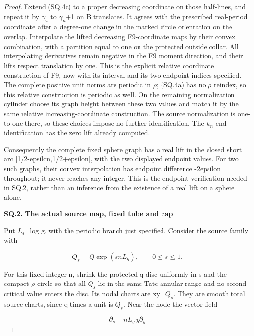\begin{proof}
Extend (SQ.4c) to a proper decreasing coordinate on those half-lines,
and repeat it by \(\gamma_{n}\) to \(\gamma_{n}\)+1 on B translates. It agrees
with the prescribed real-period coordinate after a degree-one change in the marked circle orientation
on the overlap. Interpolate the lifted decreasing F9-coordinate
maps by their convex combination, with a partition equal to one
on the protected outside collar. All interpolating derivatives
remain negative in the F9 moment direction, and their lifts respect translation by one.
This is the explicit relative coordinate construction of F9, now
with its interval and its two endpoint indices specified. The
complete positive unit norms are periodic in \(\rho\); (SQ.4a) has no
\(\rho\) reindex, so this relative construction is periodic as well.
On the remaining normalization cylinder choose its graph height
between these two values and match it by the same relative
increasing-coordinate construction. The source normalization is
one-to-one there, so these choices impose no further identification.
The \(h_{n}\) end identification has the zero lift already computed.

Consequently the complete fixed sphere graph has a real lift in the closed short arc
{[}1/2-epsilon,1/2+epsilon{]}, with the two displayed endpoint values.
For two such graphs, their convex interpolation has endpoint
difference -2epsilon throughout; it never reaches any integer.
This is the endpoint verification needed in SQ.2, rather than an
inference from the existence of a real lift on a sphere alone.

\par

\medskip\noindent\textbf{SQ.2. The actual source map, fixed tube and cap}

\par\nobreak

Put \(L_{g}\)=log g, with the periodic branch just specified. Consider the
source family with

\[
                      Q_s=Q\exp(snL_g),\qquad0\le s\le1.
                                                        \tag{SQ.5}
\]

For this fixed integer n, shrink the protected q disc uniformly in s
and the compact \(\rho\) circle so that all \(Q_{s}\) lie in the same Tate
annular range and no second critical value enters the disc.
Its nodal charts are xy=\(Q_{s}\). They are smooth total source charts,
since q times a unit is \(Q_{s}\). Near the node the vector field

\[
                 \partial_s+nL_g\,y\partial_y           \tag{SQ.6}
\]


\end{proof}

